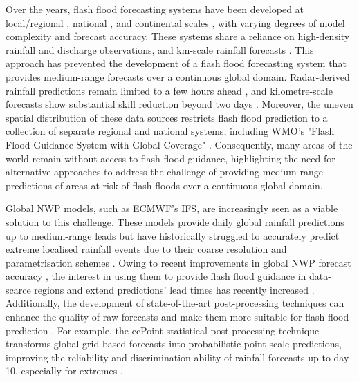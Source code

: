 Over the years, flash flood forecasting systems have been developed at local/regional \citep{Speight_2018, Corral_2019, Ibarreche_2020, RamosFilho_2021, Shuvo_2021}, national \citep{Javelle_2016, Liu_2018}, and continental scales \citep{Gourley_2017, Raynaud_2015}, with varying degrees of model complexity and forecast accuracy. These systems share a reliance on high-density rainfall and discharge observations, and km-scale rainfall forecasts \citep{Braud_2014}. This approach has prevented the development of a flash flood forecasting system that provides medium-range forecasts over a continuous global domain. Radar-derived rainfall predictions remain limited to a few hours ahead \citep{Imhoff_2022}, and kilometre-scale forecasts show substantial skill reduction beyond two days \citep{Barrett_2019}. Moreover, the uneven spatial distribution of these data sources restricts flash flood prediction to a collection of separate regional and national systems, including WMO's "Flash Flood Guidance System with Global Coverage" \citep{Georgakakos_2022}. Consequently, many areas of the world remain without access to flash flood guidance, highlighting the need for alternative approaches to address the challenge of providing medium-range predictions of areas at risk of flash floods over a continuous global domain.

Global NWP models, such as ECMWF’s IFS, are increasingly seen as a viable solution to this challenge. These models provide daily global rainfall predictions up to medium-range leads but have historically struggled to accurately predict extreme localised rainfall events due to their coarse resolution and parametrisation schemes \citep{Emerton_2016, Wen_2021}. Owing to recent improvements in global NWP forecast accuracy \citep{Haiden_2023, Lavers_2021}, the interest in using them to provide flash flood guidance in data-scarce regions and extend predictions’ lead times has recently increased \citep{Bucherie_2022b}. Additionally, the development of state-of-the-art post-processing techniques can enhance the quality of raw forecasts and make them more suitable for flash flood prediction \citep{Vannitsem_2021}. For example, the ecPoint statistical post-processing technique transforms global grid-based forecasts into probabilistic point-scale predictions, improving the reliability and discrimination ability of rainfall forecasts up to day 10, especially for extremes \citep{Hewson_2021}.

